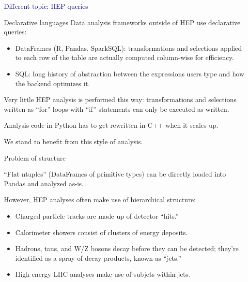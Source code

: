 \documentclass{beamer}
\begin{document}
\begin{frame}{}
\begin{center}
\Huge \textcolor{darkblue}{Different topic: HEP queries}
\end{center}
\end{frame}

\begin{frame}{Declarative languages}
\vspace{0.25 cm}
Data analysis frameworks outside of HEP use declarative queries:
\begin{itemize}
\item DataFrames (R, Pandas, SparkSQL): transformations and selections applied to each row of the table are actually computed column-wise for efficiency.
\item SQL: long history of abstraction between the expressions users type and how the backend optimizes it.
\end{itemize}

\vspace{0.5 cm}
Very little HEP analysis is performed this way: transformations and selections written as ``for'' loops with ``if'' statements can only be executed as written.

\vspace{0.25 cm}
Analysis code in Python has to get rewritten in C++ when it scales up.

\vspace{0.25 cm}
We stand to benefit from this style of analysis.
\end{frame}

\begin{frame}{Problem of structure}

``Flat ntuples'' (DataFrames of primitive types) can be directly loaded into Pandas and analyzed as-is.

\vspace{0.5 cm}
However, HEP analyses often make use of hierarchical structure:
\begin{itemize}
\item Charged particle tracks are made up of detector ``hits.''
\item Calorimeter showers consist of clusters of energy deposits.
\item Hadrons, taus, and W/Z bosons decay before they can be detected; they're identified as a spray of decay products, known as ``jets.''
\item High-energy LHC analyses make use of subjets within jets.
\end{itemize}
\end{frame}
\end{document}
